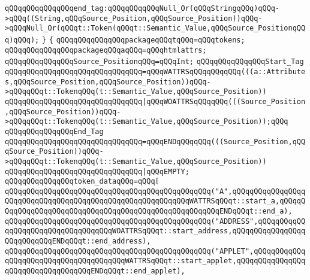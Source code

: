 \verb|qQQqqQQqqQQqqQQqend_tag:qQQqqQQqqQQqNull_Or(qQQqStringqQQq)qQQq->qQQq((String,qQQqSource_Position,qQQqSource_Position))qQQq->qQQqNull_Or(qQQqt::Token(qQQqt::Semantic_Value,qQQqSource_PositionqQQq)qQQq);|\newline
\newline
\verb|}|\newline
\verb|{|\newline
\verb|qQQqqQQqqQQqqQQqpackageqQQqtqQQq=qQQqtokens;|\newline
\verb|qQQqqQQqqQQqqQQqpackageqQQqaqQQq=qQQqhtmlattrs;|\newline
\newline
\verb|qQQqqQQqqQQqqQQqSource_PositionqQQq=qQQqInt;|\newline
\newline
\verb|qQQqqQQqqQQqqQQqStart_Tag|\newline
\verb|qQQqqQQqqQQqqQQqqQQqqQQqqQQqqQQq=qQQqWATTRSqQQqqQQqqQQq(((a::Attributes,qQQqSource_Position,qQQqSource_Position))qQQq->qQQqqQQqt::TokenqQQq(t::Semantic_Value,qQQqSource_Position))|\newline
\verb|qQQqqQQqqQQqqQQqqQQqqQQqqQQqqQQq|\verb#|qQQqWOATTRSqQQqqQQq(((Source_Position,qQQqSource_Position))qQQq->qQQqqQQqt::TokenqQQq(t::Semantic_Value,qQQqSource_Position));qQQq#\newline
\newline
\verb|qQQqqQQqqQQqqQQqEnd_Tag|\newline
\verb|qQQqqQQqqQQqqQQqqQQqqQQqqQQqqQQq=qQQqENDqQQqqQQq(((Source_Position,qQQqSource_Position))qQQq->qQQqqQQqt::TokenqQQq(t::Semantic_Value,qQQqSource_Position))|\newline
\verb|qQQqqQQqqQQqqQQqqQQqqQQqqQQqqQQq|\verb#|qQQqEMPTY;#\newline
\newline
\verb|qQQqqQQqqQQqqQQqtoken_dataqQQq=qQQq[|\newline
\verb|qQQqqQQqqQQqqQQqqQQqqQQqqQQqqQQqqQQqqQQqqQQqqQQq("A",qQQqqQQqqQQqqQQqqQQqqQQqqQQqqQQqqQQqqQQqqQQqqQQqqQQqqQQqqQQqWATTRSqQQqt::start_a,qQQqqQQqqQQqqQQqqQQqqQQqqQQqqQQqqQQqqQQqqQQqqQQqqQQqqQQqENDqQQqt::end_a),|\newline
\verb|qQQqqQQqqQQqqQQqqQQqqQQqqQQqqQQqqQQqqQQqqQQqqQQq("ADDRESS",qQQqqQQqqQQqqQQqqQQqqQQqqQQqqQQqqQQqWOATTRSqQQqt::start_address,qQQqqQQqqQQqqQQqqQQqqQQqqQQqENDqQQqt::end_address),|\newline
\verb|qQQqqQQqqQQqqQQqqQQqqQQqqQQqqQQqqQQqqQQqqQQqqQQq("APPLET",qQQqqQQqqQQqqQQqqQQqqQQqqQQqqQQqqQQqqQQqWATTRSqQQqt::start_applet,qQQqqQQqqQQqqQQqqQQqqQQqqQQqqQQqqQQqENDqQQqt::end_applet),|\newline
